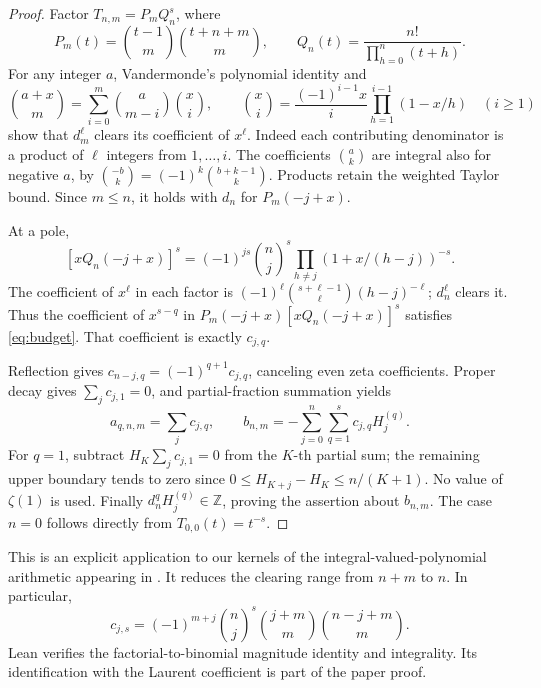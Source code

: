 \documentclass[11pt]{article}
\newcommand{\Z}{\mathbb Z}
\begin{document}
\begin{proof}
Factor $T_{n,m}=P_m Q_n^s$, where
\[
 P_m(t)=\binom{t-1}{m}\binom{t+n+m}{m},
 \qquad Q_n(t)=\frac{n!}{\prod_{h=0}^n(t+h)}.
\]
For any integer $a$, Vandermonde's polynomial identity and
\[
 \binom{a+x}{m}=\sum_{i=0}^m\binom{a}{m-i}\binom{x}{i},
 \qquad
 \binom{x}{i}=\frac{(-1)^{i-1}x}{i}
                  \prod_{h=1}^{i-1}(1-x/h)\quad(i\ge1)
\]
show that $d_m^\ell$ clears its coefficient of $x^\ell$. Indeed each
contributing denominator is a product of $\ell$ integers from $1,\ldots,i$.
The coefficients $\binom a k$ are integral also for negative $a$, by
$\binom{-b}{k}=(-1)^k\binom{b+k-1}{k}$. Products retain the weighted
Taylor bound. Since $m\le n$, it holds with $d_n$ for $P_m(-j+x)$.

At a pole,
\[
 [xQ_n(-j+x)]^s=(-1)^{js}\binom nj^s
                    \prod_{h\ne j}(1+x/(h-j))^{-s}.
\]
The coefficient of $x^\ell$ in each factor is
$(-1)^\ell\binom{s+\ell-1}{\ell}(h-j)^{-\ell}$; $d_n^\ell$ clears it.
Thus the coefficient of $x^{s-q}$ in
$P_m(-j+x)[xQ_n(-j+x)]^s$ satisfies \eqref{eq:budget}. That coefficient
is exactly $c_{j,q}$.

Reflection gives $c_{n-j,q}=(-1)^{q+1}c_{j,q}$, canceling even zeta
coefficients. Proper decay gives $\sum_jc_{j,1}=0$, and partial-fraction
summation yields
\[
 a_{q,n,m}=\sum_jc_{j,q},\qquad
 b_{n,m}=-\sum_{j=0}^n\sum_{q=1}^s c_{j,q}H_j^{(q)}.
\]
For $q=1$, subtract $H_K\sum_jc_{j,1}=0$ from the $K$-th partial sum;
the remaining upper boundary tends to zero since
$0\le H_{K+j}-H_K\le n/(K+1)$. No value of $\zeta(1)$ is used.
Finally $d_n^q H_j^{(q)}\in\Z$, proving the assertion about $b_{n,m}$.
The case $n=0$ follows directly from $T_{0,0}(t)=t^{-s}$.
\end{proof}

This is an explicit application to our kernels of the
integral-valued-polynomial arithmetic appearing in \cite[Section 2]{Zudilin}.
It reduces the clearing range from $n+m$ to $n$. In particular,
\[
 c_{j,s}=(-1)^{m+j}\binom nj^s\binom{j+m}{m}\binom{n-j+m}{m}.
\]
Lean verifies the factorial-to-binomial magnitude identity and integrality.
Its identification with the Laurent coefficient is part of the paper proof.
\end{document}
